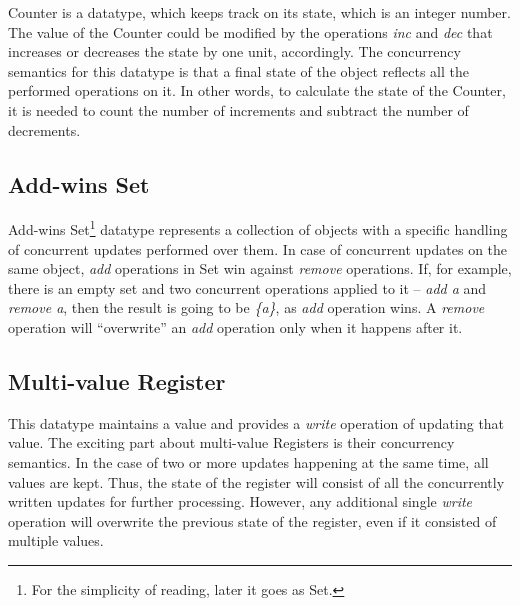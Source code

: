 Counter is a datatype, which keeps track on its state, which is an integer number. The value of the Counter could be modified by the operations \textit{inc} and \textit{dec} that increases or decreases the state by one unit, accordingly\cite{3}. The concurrency semantics for this datatype is that a final state of the object reflects all the performed operations on it. In other words, to calculate the state of the Counter, it is needed to count the number of increments and subtract the number of decrements. 

\subsection*{Add-wins Set}

Add-wins Set\footnote{For the simplicity of reading, later it goes as Set.} datatype represents a collection of objects with a specific handling of concurrent updates performed over them. In case of concurrent updates on the same object, \textit{add} operations in Set win against \textit{remove} operations. If, for example, there is an empty set \textit{} and two concurrent operations applied to it -- \textit{add a} and \textit{remove a}, then the result is going to be \textit{\{a\}}, as \textit{add} operation wins. A \textit{remove} operation will ``overwrite'' an \textit{add} operation only when it happens after it\cite{3}. 

\subsection*{Multi-value Register}

This datatype maintains a value and provides a \textit{write} operation of updating that value. The exciting part about multi-value Registers is their concurrency semantics. In the case of two or more updates happening at the same time, all values are kept. Thus, the state of the register will consist of all the concurrently written updates for further processing. However, any additional single \textit{write} operation will overwrite the previous state of the register, even if it consisted of multiple values\cite{39}.